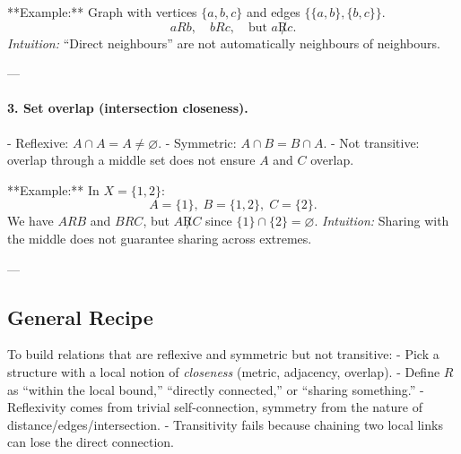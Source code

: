 \documentclass[11pt,a4paper]{article}
\begin{document}
	**Example:** Graph with vertices $\{a,b,c\}$ and edges $\{\{a,b\},\{b,c\}\}$.  
	$$
	aRb, \quad bRc, \quad \text{but } a \not R c.
	$$
	\emph{Intuition:} “Direct neighbours” are not automatically neighbours of neighbours.
	
	---
	
	\paragraph{3. Set overlap (intersection closeness).}  
	- Reflexive: $A \cap A = A \neq \varnothing$.  
	- Symmetric: $A\cap B = B\cap A$.  
	- Not transitive: overlap through a middle set does not ensure $A$ and $C$ overlap.  
	
	**Example:** In $X=\{1,2\}$:  
	$$
	A=\{1\},\; B=\{1,2\},\; C=\{2\}.
	$$
	We have $A R B$ and $B R C$, but $A \not R C$ since $\{1\}\cap\{2\}=\varnothing$.  
	\emph{Intuition:} Sharing with the middle does not guarantee sharing across extremes.
	
	---
	
	\subsection*{General Recipe}
	To build relations that are reflexive and symmetric but not transitive:
	- Pick a structure with a local notion of \emph{closeness} (metric, adjacency, overlap).  
	- Define $R$ as “within the local bound,” “directly connected,” or “sharing something.”  
	- Reflexivity comes from trivial self-connection, symmetry from the nature of distance/edges/intersection.  
	- Transitivity fails because chaining two local links can lose the direct connection.
	
	
\end{document}
